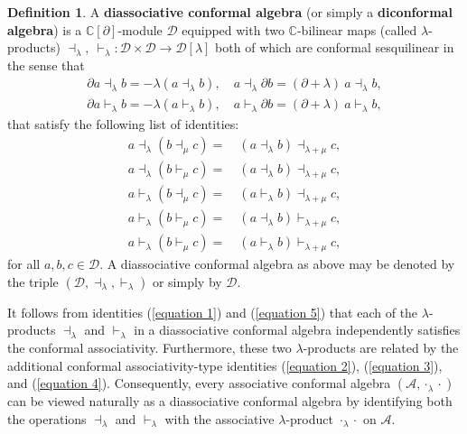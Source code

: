 \documentclass[a4paper,reqno,10pt]{amsart}
\theoremstyle{plain}
\theoremstyle{definition}
\newtheorem{definition}[thm]{Definition}
\theoremstyle{remark}
\newcommand{\C}{\mathbb{C}}
\newcommand{\D}{\mathcal{D}}
\newcommand{\p}{\partial}
\newcommand{\la}{\lambda}
\begin{document}
\begin{definition}
 A \textbf{diassociative conformal algebra} (or simply a {\bf diconformal algebra}) is a $\C[\p]$-module $\D$ equipped with two $\C$-bilinear maps (called $\la$-products) $\dashv_{\la}, ~  \! \vdash_{\la} : \D \times \D \rightarrow \D[ \la ]$ both of which are conformal sesquilinear in the sense that
 \begin{align}
     \partial a \dashv_\la b = - \la (a \dashv_\la b), \quad a \dashv_\la \partial b = (\partial + \la) ~  \! a \dashv_\la b, \label{ses1}\\
     \partial a \vdash_\la b = - \la (a \vdash_\la b), \quad a \vdash_\la \partial b = (\partial + \la) ~  \! a \vdash_\la b, \label{ses2}
 \end{align}
 that satisfy the following list of identities: 
    \begin{align}
   a\dashv_{\la}(b \dashv_{\mu}c)=~&(a\dashv_{\la}b)\dashv_{\la + \mu}c,\label{equation 1} \\
 a \dashv_{\la}(b \vdash_{\mu}c) =~& (a\dashv_{\la}b)\dashv_{\la + \mu}c,\label{equation 2}\\
  a\vdash_{\la}(b \dashv_{\mu}c) =~&  (a\vdash_{\la}b)\dashv_{\la + \mu}c,\label{equation 3}\\
   a \vdash_{\la}(b\vdash_{\mu}c)=~&(a\dashv_{\la}b)\vdash_{\la+\mu}c,\label{equation 4}\\
  a \vdash_{\la}(b\vdash_{\mu}c)=~&(a\vdash_{\la}b)\vdash_{\la + \mu}c, \label{equation 5}
\end{align} 
for all $a,b,c \in \D$. A diassociative conformal algebra as above may be denoted by the triple $(\D, \dashv_{\la},\vdash_{\la})$ or simply by $\D$.
\end{definition}

It follows from identities (\ref{equation 1}) and (\ref{equation 5}) that each of the $\la$-products $\dashv_{\la}$ and $\vdash_{\la}$ in a diassociative conformal algebra independently satisfies the conformal associativity. Furthermore, these two $\la$-products are related by the additional conformal associativity-type identities (\ref{equation 2}), (\ref{equation 3}), and (\ref{equation 4}). Consequently, every associative conformal algebra $(\mathcal{A}, \cdot_{\la} \cdot)$ can be viewed naturally as a diassociative conformal algebra by identifying both the operations $\dashv_{\la}$ and $\vdash_{\la}$ with the associative $\la$-product $\cdot_{\la} \cdot$ on $\mathcal{A}$.

\medskip
\end{document}
